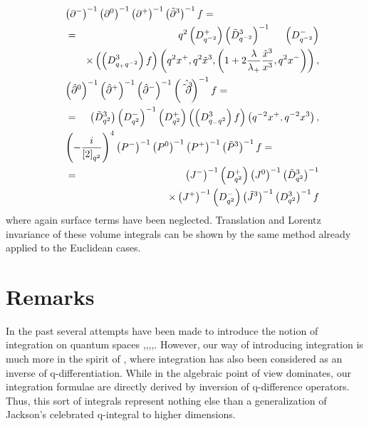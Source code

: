 \documentclass[a4paper,11pt,oneside]{article}
\begin{document}
\begin{eqnarray}
\lefteqn{\left( \partial ^{-}\right) ^{-1}\left( \partial ^{0}\right) ^{-1}\left(
\partial ^{+}\right) ^{-1}\left( \tilde{\partial}^{3}\right) ^{-1}f
=}\\ &=&q^{2}\left( D_{q^{-2}}^{+}\right) \left( \tilde{D}_{q^{-2}}^{3}\right)
^{-1} \hspace*{.5cm} \left( D_{q^{-2}}^{-}\right)\nonumber\\ \hspace{.5cm}&&\times \left( \left(
D_{q_{+}q^{-2}}^{3}\right) f\right) \left( q^{2}x^{+},q^{2}\tilde{x}%
^{3},\left( 1+2\frac{\lambda}{\lambda_{+}}\frac{\tilde{x}^{3}}{x^{3}}%
,q^{2}x^{-}\right) \right) ,  \nonumber \\
\lefteqn{\left( \hat{\partial}^{0}\right) ^{-1}\left( \hat{\partial}^{+}\right)
^{-1}\left( \hat{\partial}^{-}\right) ^{-1}\left( \hat{\tilde{\partial}^{3}}%
\right) ^{-1}f =} \nonumber \\
\hspace*{.5cm}&=&\left( \tilde{D}_{q^{2}}^{3}\right) \left(
D_{q^{2}}^{-}\right) ^{-1}\left( D_{q^{2}}^{+}\right) \left( \left(
D_{q_{-}q^{2}}^{3}\right) f\right) \left( q^{-2}x^{+},q^{-2}x^{3}\right) , 
\nonumber \\
\lefteqn{\left( -\frac{i}{\left[ 2\right] _{q^{2}}}\right) ^{4}\left( P^{-}\right)
^{-1}\left( P^{0}\right) ^{-1}\left( P^{+}\right) ^{-1}\left( \tilde{P}%
^{3}\right) ^{-1}f =} \nonumber  \\
\hspace*{.5cm}&=&\left( J^{-}\right) ^{-1}\left( D_{q^{2}}^{+}\right)
\left( J^{0}\right) ^{-1}\left( \tilde{D}_{q^{2}}^{3}\right) ^{-1}
\nonumber\\\hspace{.5cm}&&\times\left(
J^{+}\right) ^{-1}\left( D_{q^{2}}^{-}\right) \left( \tilde{J}^{3}\right)
^{-1}\left( D_{q^{2}}^{3}\right) ^{-1}f  \nonumber
\end{eqnarray}
where again surface terms have been neglected. Translation and
Lorentz invariance of these volume integrals can be shown by the same
method already applied to the Euclidean cases.

\section{Remarks}

In the past several attempts have been made to introduce the notion of
integration on quantum spaces \cite{Ste96},\cite{CZ93},\cite{Fio93},\cite
{HW92},\cite{Die01}. However, our way of introducing integration is much
more in the spirit of \cite{KM94}, where integration has also been
considered as an inverse of q-differentiation. While in \cite{KM94} the
algebraic point of view dominates, our integration formulae are directly
derived by inversion of q-difference operators. Thus, this sort of integrals
represent nothing else than a generalization of Jackson's celebrated
q-integral to higher dimensions.
\end{document}
